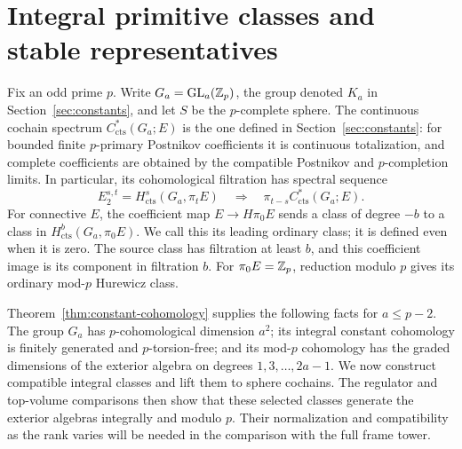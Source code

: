 \section{Integral primitive classes and stable representatives}
\label{sec:generators}

Fix an odd prime $p$.  Write $G_a=\operatorname{GL}_a(\mathbb Z_p)$, the group denoted
$K_a$ in Section~\ref{sec:constants}, and let $S$ be the
$p$-complete sphere.  The continuous cochain spectrum
$C^*_{\mathrm{cts}}(G_a;E)$ is the one defined in
Section~\ref{sec:constants}: for bounded finite $p$-primary Postnikov
coefficients it is continuous totalization, and complete coefficients
are obtained by the compatible Postnikov and $p$-completion limits.
In particular, its cohomological filtration has spectral sequence
\begin{equation}\label{gen:ahss}
 E_2^{s,t}=H^s_{\mathrm{cts}}(G_a,\pi_tE)
 \quad\Longrightarrow\quad
 \pi_{t-s}C^*_{\mathrm{cts}}(G_a;E).
\end{equation}
For connective $E$, the coefficient map $E\to H\pi_0E$ sends a
class of degree $-b$ to a class in
$H^b_{\mathrm{cts}}(G_a,\pi_0E)$.  We call this its leading ordinary
class; it is defined even when it is zero.  The source class has
filtration at least $b$, and this coefficient image is its component
in filtration $b$.  For $\pi_0E=\mathbb Z_p$, reduction modulo $p$ gives its
ordinary mod-$p$ Hurewicz class.

Theorem~\ref{thm:constant-cohomology} supplies the following facts for
$a\leq p-2$.  The group $G_a$ has $p$-cohomological dimension $a^2$;
its integral constant cohomology is finitely generated and
$p$-torsion-free; and its mod-$p$ cohomology has the graded dimensions
of the exterior algebra on degrees $1,3,\ldots,2a-1$.
We now construct compatible integral classes and lift them to sphere
cochains.  The regulator and top-volume comparisons then show that
these selected classes generate the exterior algebras integrally and
modulo $p$.  Their normalization and compatibility as the rank varies
will be needed in the comparison with the full frame tower.

